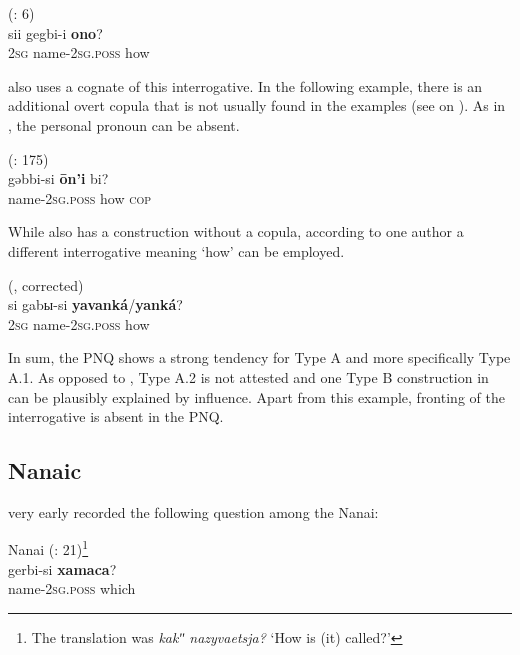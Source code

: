 \documentclass[output=paper,colorlinks,citecolor=brown]{langscibook}
\begin{document}
\ea
    \label{example4.89}
     (\citealt{Tsumagari2006}: 6)\\
    \gll sii		gegbi-i			\textbf{ono}?\\
    2\textsc{sg}		name-2\textsc{sg.poss}		how\\
    \z

 also uses a cognate of this interrogative. In the following example, there is an additional overt copula that is not usually found in the  examples (see  on ). As in , the personal pronoun can be absent.

\ea
    \label{example4.90}
     (\citealt{AvrorinLebedeva1978H}: 175)\\
    \gll gəbbi-si			\textbf{ōn’i}		bi?\\
    name-2\textsc{sg.poss}		how		\textsc{cop}\\
    \z

\noindent While  also has a construction without a copula, according to one author a different interrogative meaning ‘how’ can be employed.

\ea
    \label{example4.91}
     (\citealt{Lopatin1957}, corrected)\\
    \gll si		gabы-si			\textbf{yavanká}/\textbf{yanká}?\\
    2\textsc{sg}		name-2\textsc{sg.poss}		how\\
    \z

In sum, the  PNQ shows a strong tendency for Type A and more specifically Type A.1. As opposed to , Type A.2 is not attested and one Type B construction in  can be plausibly explained by  influence. Apart from this example, fronting of the interrogative is absent in the  PNQ.


\subsection{Nanaic}\label{section4.4.5}

\citet{Brylkin1861} very early recorded the following question among the  Nanai:

\ea
    \label{example4.92}
     Nanai (\citealt{Brylkin1861}: 21)\footnote{The  translation was \textit{kakʺ nazyvaetsja?} ‘How is (it) called?’}\\
    \gll gerbi-si			\textbf{xamaca}?\\
    name-2\textsc{sg.poss}		which\\
    \z
\end{document}
